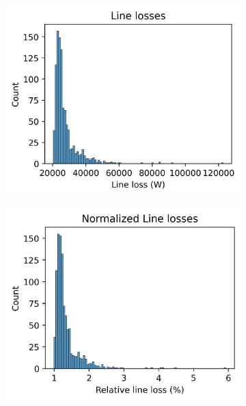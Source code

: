 \begin{figure}[H]
\begin{subfigure}{.33\textwidth}
        \caption{}
        \label{fig:result:suburban:histograms:max_trafo}
      \end{subfigure}%
      \begin{subfigure}{.33\textwidth}
        \centering
        \includegraphics[width=\linewidth]{img/switchstate_exploring/swiss_suburb/histograms/line_loss.png}
        \caption{}
        \label{fig:result:suburban:histograms:line_loss}
      \end{subfigure}%
      \begin{subfigure}{.33\textwidth}
        \centering
        \includegraphics[width=\linewidth]{img/switchstate_exploring/swiss_suburb/histograms/line_loss_relative.png}

\end{subfigure}
\end{figure}
